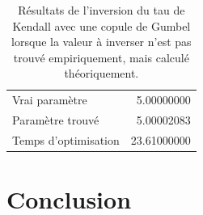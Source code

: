 \documentclass{article}
\begin{document}
	\begin{table}[H]
		\centering
		\begin{tabular}{lr}
			\hline
			Vrai paramètre & 5.00000000 \\ 
			Paramètre trouvé & 5.00002083 \\ 
			Temps d'optimisation & 23.61000000 \\  
			\hline
		\end{tabular}
		\caption{Résultats de l'inversion du tau de Kendall avec une copule de Gumbel lorsque la valeur à inverser n'est pas trouvé empiriquement, mais calculé théoriquement.}
		\label{tbl_Resultats_Gumbel_th}
	\end{table}

	\section{Conclusion}

	\newpage
	
	
	 
	 
\end{document}
